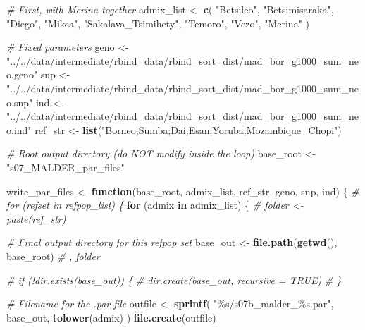 \documentclass[
]{article}
\newenvironment{Shaded}{\begin{snugshade}}{\end{snugshade}}
\newcommand{\CommentTok}[1]{\textcolor[rgb]{0.56,0.35,0.01}{\textit{#1}}}
\newcommand{\ControlFlowTok}[1]{\textcolor[rgb]{0.13,0.29,0.53}{\textbf{#1}}}
\newcommand{\FunctionTok}[1]{\textcolor[rgb]{0.13,0.29,0.53}{\textbf{#1}}}
\newcommand{\NormalTok}[1]{#1}
\newcommand{\OtherTok}[1]{\textcolor[rgb]{0.56,0.35,0.01}{#1}}
\newcommand{\StringTok}[1]{\textcolor[rgb]{0.31,0.60,0.02}{#1}}
\begin{document}
\begin{Shaded}
\begin{Highlighting}[]
\CommentTok{\# First, with Merina together}
\NormalTok{admix\_list }\OtherTok{\textless{}{-}} \FunctionTok{c}\NormalTok{(}
  \StringTok{"Betsileo"}\NormalTok{, }\StringTok{"Betsimisaraka"}\NormalTok{, }\StringTok{"Diego"}\NormalTok{, }\StringTok{"Mikea"}\NormalTok{,}
  \StringTok{"Sakalava\_Tsimihety"}\NormalTok{, }\StringTok{"Temoro"}\NormalTok{, }\StringTok{"Vezo"}\NormalTok{, }\StringTok{"Merina"}
\NormalTok{)}

\CommentTok{\# Fixed parameters}
\NormalTok{geno }\OtherTok{\textless{}{-}} \StringTok{"../../data/intermediate/rbind\_data/rbind\_sort\_dist/mad\_bor\_g1000\_sum\_neo.geno"}
\NormalTok{snp }\OtherTok{\textless{}{-}} \StringTok{"../../data/intermediate/rbind\_data/rbind\_sort\_dist/mad\_bor\_g1000\_sum\_neo.snp"}
\NormalTok{ind }\OtherTok{\textless{}{-}} \StringTok{"../../data/intermediate/rbind\_data/rbind\_sort\_dist/mad\_bor\_g1000\_sum\_neo.ind"}
\NormalTok{ref\_str }\OtherTok{\textless{}{-}} \FunctionTok{list}\NormalTok{(}\StringTok{"Borneo;Sumba;Dai;Esan;Yoruba;Mozambique\_Chopi"}\NormalTok{)}

\CommentTok{\# Root output directory (do NOT modify inside the loop)}
\NormalTok{base\_root }\OtherTok{\textless{}{-}} \StringTok{"s07\_MALDER\_par\_files"}

\NormalTok{write\_par\_files }\OtherTok{\textless{}{-}} \ControlFlowTok{function}\NormalTok{(base\_root,}
\NormalTok{                            admix\_list,}
\NormalTok{                            ref\_str,}
\NormalTok{                            geno,}
\NormalTok{                            snp,}
\NormalTok{                            ind) \{}
  \CommentTok{\# for (refset in refpop\_list) \{}
  \ControlFlowTok{for}\NormalTok{ (admix }\ControlFlowTok{in}\NormalTok{ admix\_list) \{}
    \CommentTok{\# folder \textless{}{-} paste(ref\_str)}

    \CommentTok{\# Final output directory for this refpop set}
\NormalTok{    base\_out }\OtherTok{\textless{}{-}} \FunctionTok{file.path}\NormalTok{(}\FunctionTok{getwd}\NormalTok{(), base\_root) }\CommentTok{\# , folder}

    \CommentTok{\# if (!dir.exists(base\_out)) \{}
    \CommentTok{\#  dir.create(base\_out, recursive = TRUE)}
    \CommentTok{\# \}}

    \CommentTok{\# Filename for the .par file}
\NormalTok{    outfile }\OtherTok{\textless{}{-}} \FunctionTok{sprintf}\NormalTok{(}
      \StringTok{"\%s/s07b\_malder\_\%s.par"}\NormalTok{,}
\NormalTok{      base\_out, }\FunctionTok{tolower}\NormalTok{(admix)}
\NormalTok{    )}
    \FunctionTok{file.create}\NormalTok{(outfile)}


\end{Highlighting}
\end{Shaded}
\end{document}

